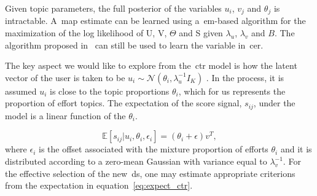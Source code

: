 Given topic parameters, the full posterior of the variables $u_{i}$, $v_{j}$ and $\theta_{j}$ is intractable. A~\gls{map} estimate can be learned using a~\gls{em}-based algorithm for the maximization of the log likelihood of U, V, $\Theta$ and S given $\lambda_{u}$, $\lambda_{v}$ and $B$. The algorithm proposed in~\cite{wang_collaborative_2011} can still be used to learn the variable in~\gls{cer}. 

The key aspect we would like to explore from the~\gls{ctr} model is how the latent vector of the user is taken to be $u_{i} \sim \mathcal{N}(\theta_{i}, \lambda_{u}^{-1}I_{K})$ %
. In the process, it is assumed $u_{i}$ is close to the topic proportions $\theta_{i}$, which for us represents the proportion of effort topics. The expectation of the score signal, $s_{ij}$, under the model is a linear function of the $\theta_{i}$.

\begin{equation}
    \mathbb{E}[s_{ij}|u_{i}, \theta_{i}, \epsilon_{i}] = (\theta_{i} + \epsilon)v^{T},
    \label{eq:expect_ctr}
\end{equation}
where $\epsilon_{i}$ is the offset associated with the mixture proportion of efforts $\theta_{i}$ and it is distributed according to a zero-mean Gaussian with variance equal to $\lambda_{v}^{-1}$. For the effective selection of the new~\gls{ds}, one may estimate appropriate criterions from the expectation in equation~\ref{eq:expect_ctr}.


